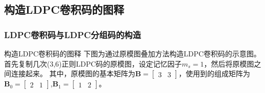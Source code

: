 \documentclass{beamer}
\begin{document}
\subsection{构造LDPC卷积码的图释}
\begin{frame}[shrink]
	\frametitle{LDPC卷积码与LDPC分组码的构造}
		\begin{block}{构造LDPC卷积码的图释}
下图为通过原模图叠加方法构造LDPC卷积码的示意图。
首先复制几次(3,6)正则LDPC码的原模图，设定记忆因子$m_s=1$，然后将原模图之间连接起来。
其中，原模图的基本矩阵为$ \mathbf{B} = [\begin{array}{cc} 3&3 \end{array}]$，使用到的组成矩阵为$\mathbf{B}_0 = [\begin{array}{cc} 2&1 \end{array}]$,$\mathbf{B}_1 = [\begin{array}{cc} 1&2 \end{array}]$。


\end{block}
\end{frame}
\end{document}
